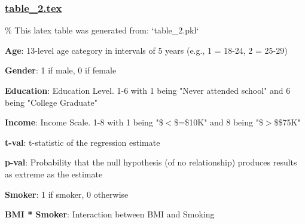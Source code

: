 \documentclass[11pt]{article}
\begin{document}
\subsubsection*{\hyperlink{code-LaTeX Table Design-table-2-tex}{table\_2.tex}}

\begin{codeoutput}
\% This latex table was generated from: `table\_2.pkl`
\begin{table}[h]
\caption{Analysis of relationship between BMI and Diabetes moderated by Smoking Status}
\label{table:bmi\_smoking}
\begin{threeparttable}
\renewcommand{\TPTminimum}{\linewidth}
\begin{tablenotes}
\footnotesize
\item \textbf{Age}: 13-level age category in intervals of 5 years (e.g., 1 = 18-24, 2 = 25-29)
\item \textbf{Gender}: 1 if male, 0 if female
\item \textbf{Education}: Education Level. 1-6 with 1 being "Never attended school" and 6 being "College Graduate"
\item \textbf{Income}: Income Scale. 1-8 with 1 being "\$$<$\$=\$10K" and 8 being "\$$>$\$\$75K"
\item \textbf{t-val}: t-statistic of the regression estimate
\item \textbf{p-val}: Probability that the null hypothesis (of no relationship) produces results as extreme as the estimate
\item \textbf{Smoker}: 1 if smoker, 0 otherwise
\item \textbf{BMI * Smoker}: Interaction between BMI and Smoking
\end{tablenotes}
\end{threeparttable}
\end{table}

\end{codeoutput}
\end{document}
